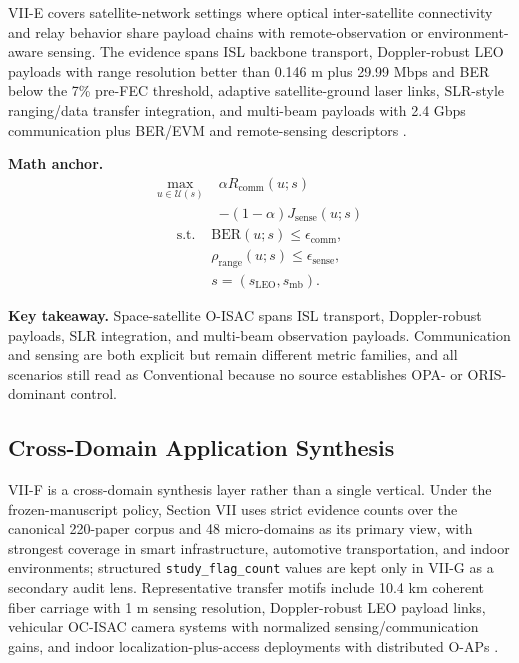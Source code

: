 VII-E covers satellite-network settings where optical inter-satellite connectivity and relay behavior share payload chains with remote-observation or environment-aware sensing. The evidence spans ISL backbone transport, Doppler-robust LEO payloads with range resolution better than 0.146 m plus 29.99 Mbps and BER below the 7\% pre-FEC threshold, adaptive satellite-ground laser links, SLR-style ranging/data transfer integration, and multi-beam payloads with 2.4 Gbps communication plus BER/EVM and remote-sensing descriptors \cite{O_ISAC_089,O_ISAC_137,O_ISAC_187,O_ISAC_195,O_ISAC_252}.

\textbf{Math anchor.}
\begin{equation}
    \begin{split}
        \max_{u\in\mathcal{U}(s)}\; & \alpha R_{\mathrm{comm}}(u;s)      \\
                                    & -(1-\alpha)J_{\mathrm{sense}}(u;s)
    \end{split}
\end{equation}
\begin{equation}
    \begin{split}
        \text{s.t. } & \mathrm{BER}(u;s)\le\epsilon_{\mathrm{comm}},           \\
                     & \rho_{\mathrm{range}}(u;s)\le\epsilon_{\mathrm{sense}}, \\
                     & s=(s_{\mathrm{LEO}},s_{\mathrm{mb}}).
    \end{split}
\end{equation}

\textbf{Key takeaway.} Space-satellite O-ISAC spans ISL transport, Doppler-robust payloads, SLR integration, and multi-beam observation payloads. Communication and sensing are both explicit but remain different metric families, and all scenarios still read as Conventional because no source establishes OPA- or ORIS-dominant control.

\subsection{Cross-Domain Application Synthesis}

VII-F is a cross-domain synthesis layer rather than a single vertical. Under the frozen-manuscript policy, Section VII uses strict evidence counts over the canonical 220-paper corpus and 48 micro-domains as its primary view, with strongest coverage in smart infrastructure, automotive transportation, and indoor environments; structured \texttt{study\_flag\_count} values are kept only in VII-G as a secondary audit lens. Representative transfer motifs include 10.4 km coherent fiber carriage with 1 m sensing resolution, Doppler-robust LEO payload links, vehicular OC-ISAC camera systems with normalized sensing/communication gains, and indoor localization-plus-access deployments with distributed O-APs \cite{O_ISAC_011,O_ISAC_074,O_ISAC_108,O_ISAC_164,O_ISAC_187}.

